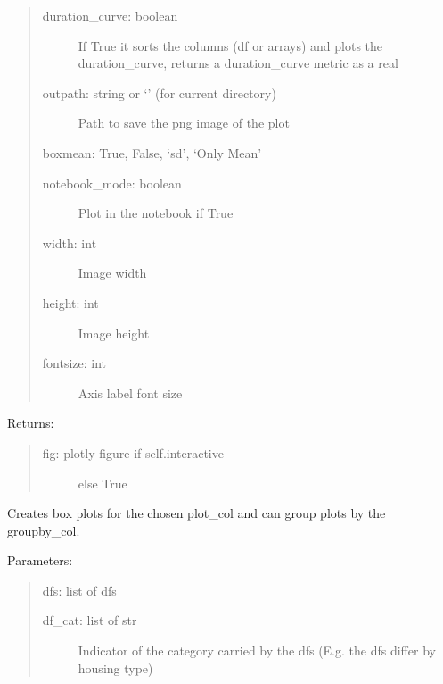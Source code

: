 \documentclass[letterpaper,10pt,english,openany]{sphinxmanual}
\begin{document}
\begin{fulllineitems}
\begin{quote}
\begin{description}
\item[{duration\_curve: boolean}] \leavevmode
If True it sorts the columns (df or arrays)
and plots the duration\_curve, returns a
duration\_curve metric as a real

\item[{outpath: string or ‘’ (for current directory)}] \leavevmode
Path to save the png image of the plot

\end{description}

boxmean: True, False, ‘sd’, ‘Only Mean’
\begin{description}
\item[{notebook\_mode: boolean}] \leavevmode
Plot in the notebook if True

\item[{width: int}] \leavevmode
Image width

\item[{height: int}] \leavevmode
Image height

\item[{fontsize: int}] \leavevmode
Axis label font size

\end{description}
\end{quote}

Returns:
\begin{quote}
\begin{description}
\item[{fig: plotly figure if self.interactive}] \leavevmode
else True

\end{description}
\end{quote}

\begin{fulllineitems}
\label{\detokenize{source/mswh.tools:mswh.tools.plots.Plot.box}}
Creates box plots for the chosen plot\_col and can
group plots by the groupby\_col.

Parameters:
\begin{quote}

dfs: list of dfs
\begin{description}
\item[{df\_cat: list of str}] \leavevmode
Indicator of the category carried by the dfs
(E.g. the dfs differ by housing type)


\end{description}
\end{quote}
\end{fulllineitems}
\end{fulllineitems}
\end{document}
